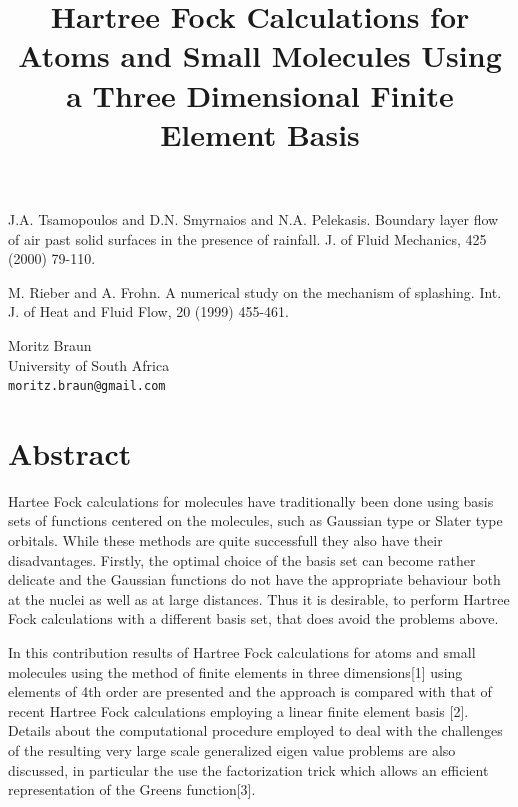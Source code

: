 \documentclass[article, A4, 11pt]{llncs}%
\begin{document}

\begin{thebibliography}{10}
{\sc J.A. Tsamopoulos and D.N. Smyrnaios and N.A. Pelekasis}. {Boundary layer flow of air past solid surfaces in the presence of rainfall}. J. of Fluid Mechanics, 425 (2000) 79-110.

{\sc M. Rieber and A. Frohn}. {A numerical study on the mechanism of splashing}. Int. J. of Heat and Fluid Flow, 20 (1999) 455-461.
\end{thebibliography} %

\title{Hartree Fock Calculations for Atoms and Small Molecules Using  a Three Dimensional  Finite Element Basis}
 \author{} \institute{}
\maketitle
\begin{center}
{\large Moritz Braun}\\
University of South Africa\\
{\tt moritz.braun@gmail.com}
\end{center}

\section*{Abstract}
Hartee Fock calculations for molecules have traditionally been done using basis sets 
of functions centered on  the molecules, such as Gaussian type or Slater type orbitals. While these methods are quite successfull they  also have their disadvantages. Firstly, the optimal choice of the basis set can become rather delicate and the Gaussian functions do not have the appropriate behaviour both at the nuclei as  well as at large distances. Thus it is desirable, to perform Hartree Fock calculations with a different basis set, that does avoid the problems above.

In this contribution results of Hartree Fock calculations  for atoms and small molecules using the method of finite elements in three dimensions[1] using elements of 4th order are presented and the approach is  compared with that  of recent Hartree Fock calculations employing a linear finite element basis [2].  Details about the computational procedure employed to deal with the challenges of the resulting very large scale generalized eigen value problems are also discussed, in particular the use the factorization trick which allows an efficient representation of the Greens function[3].
\end{document}
